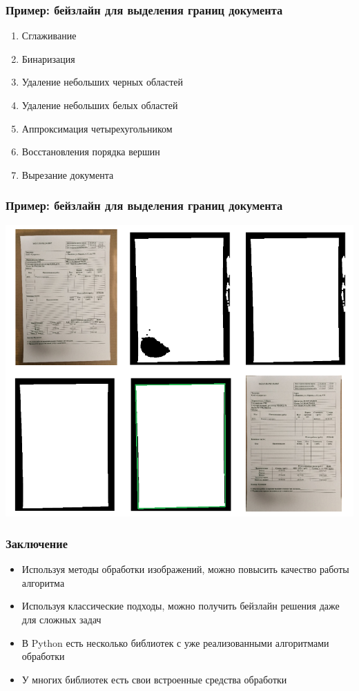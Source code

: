 \documentclass[fleqn, xcolor=x11names]{beamer}
\begin{document}
\begin{frame}[fragile]\frametitle{Пример: бейзлайн для выделения границ документа}
\begin{enumerate}
    \item Сглаживание
    \item Бинаризация
    \item Удаление небольших черных областей
    \item Удаление небольших белых областей
    \item Аппроксимация четырехугольником
    \item Восстановления порядка вершин
    \item Вырезание документа
\end{enumerate}

\end{frame}

\begin{frame}[fragile]\frametitle{Пример: бейзлайн для выделения границ документа}
\begin{center}
\includegraphics[scale=0.4]{images/img_doc.png}
\end{center}
\end{frame}

\begin{frame}[fragile]\frametitle{Заключение}
\begin{itemize}
\item Используя методы обработки изображений, можно повысить качество работы алгоритма

\item Используя классические подходы, можно получить бейзлайн решения даже для сложных задач

\item В Python есть несколько библиотек с уже реализованными алгоритмами обработки

\item У многих библиотек есть свои встроенные средства обработки 
\end{itemize}
\end{frame}
\end{document}
